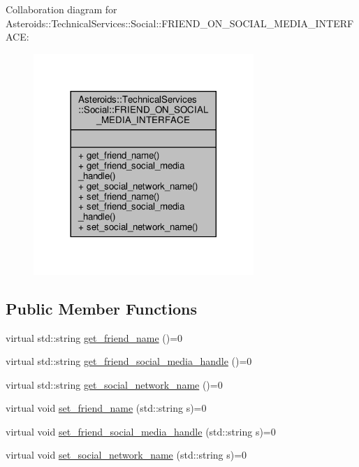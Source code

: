 Collaboration diagram for Asteroids\+:\+:Technical\+Services\+:\+:Social\+:\+:F\+R\+I\+E\+N\+D\+\_\+\+O\+N\+\_\+\+S\+O\+C\+I\+A\+L\+\_\+\+M\+E\+D\+I\+A\+\_\+\+I\+N\+T\+E\+R\+F\+A\+CE\+:
\nopagebreak
\begin{figure}[H]
\begin{center}
\leavevmode
\includegraphics[width=236pt]{classAsteroids_1_1TechnicalServices_1_1Social_1_1FRIEND__ON__SOCIAL__MEDIA__INTERFACE__coll__graph}
\end{center}
\end{figure}
\subsection*{Public Member Functions}
\begin{DoxyCompactItemize}
\item 
virtual std\+::string \hyperlink{classAsteroids_1_1TechnicalServices_1_1Social_1_1FRIEND__ON__SOCIAL__MEDIA__INTERFACE_ac33cbcd8656e9cfd0c725f33c15f537c}{get\+\_\+friend\+\_\+name} ()=0
\item 
virtual std\+::string \hyperlink{classAsteroids_1_1TechnicalServices_1_1Social_1_1FRIEND__ON__SOCIAL__MEDIA__INTERFACE_a1731234f472194ef61990227c88971e5}{get\+\_\+friend\+\_\+social\+\_\+media\+\_\+handle} ()=0
\item 
virtual std\+::string \hyperlink{classAsteroids_1_1TechnicalServices_1_1Social_1_1FRIEND__ON__SOCIAL__MEDIA__INTERFACE_a695c43020081a6ca5d4537762b63006b}{get\+\_\+social\+\_\+network\+\_\+name} ()=0
\item 
virtual void \hyperlink{classAsteroids_1_1TechnicalServices_1_1Social_1_1FRIEND__ON__SOCIAL__MEDIA__INTERFACE_a22adfcb43164427ab44c7dd03505278c}{set\+\_\+friend\+\_\+name} (std\+::string s)=0
\item 
virtual void \hyperlink{classAsteroids_1_1TechnicalServices_1_1Social_1_1FRIEND__ON__SOCIAL__MEDIA__INTERFACE_ab2ced7d2f5b5ce41908782128495853a}{set\+\_\+friend\+\_\+social\+\_\+media\+\_\+handle} (std\+::string s)=0
\item 
virtual void \hyperlink{classAsteroids_1_1TechnicalServices_1_1Social_1_1FRIEND__ON__SOCIAL__MEDIA__INTERFACE_a11f7a97e970b402d0baea3b6f69f0f86}{set\+\_\+social\+\_\+network\+\_\+name} (std\+::string s)=0
\end{DoxyCompactItemize}


